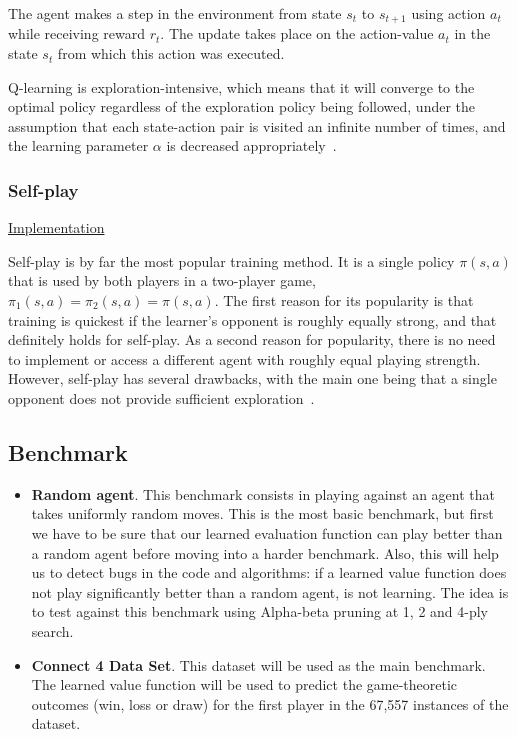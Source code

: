 \documentclass{article}
\newcommand{\GithubURL}[2]{
\noindent
\href{https://github.com/davidrobles/mlnd-capstone-code/blob/master/#1}{#2}
\break
}
\begin{document}
The agent makes a step in the environment from state $s_t$ to $s_{t+1}$ using action $a_t$ while
receiving reward $r_t$. The update takes place on the action-value $a_t$ in the state $s_t$ from
which this action was executed.

Q-learning is exploration-intensive, which means that it will converge to the optimal policy
regardless of the exploration policy being followed, under the assumption that each state-action
pair is visited an infinite number of times, and the learning parameter $\alpha$ is decreased
appropriately~\citep{Watkins1992Q}.

\subsubsection{Self-play}

\GithubURL{capstone/rl/learners/qlearning_selfplay.py}{Implementation}

Self-play is by far the most popular training method. It is a single policy $\pi(s,a)$ that is used
by both players in a two-player game, $\pi_1(s,a) = \pi_2(s,a) = \pi(s,a)$. The first reason for its
popularity is that training is quickest if the learner's opponent is roughly equally strong, and
that definitely holds for self-play. As a second reason for popularity, there is no need to
implement or access a different agent with roughly equal playing strength. However, self-play has
several drawbacks, with the main one being that a single opponent does not provide sufficient
exploration~\citep{Szita2011RLGames}.

\subsection{Benchmark}
\label{sec:benchmark}

\begin{itemize}

    \item \textbf{Random agent}. This benchmark consists in playing against an agent that takes
        uniformly random moves. This is the most basic benchmark, but first we have to be sure that
        our learned evaluation function can play better than a random agent before moving into a
        harder benchmark. Also, this will help us to detect bugs in the code and algorithms: if a
        learned value function does not play significantly better than a random agent, is not
        learning. The idea is to test against this benchmark using Alpha-beta pruning at 1, 2 and
        4-ply search.

    \item \textbf{Connect 4 Data Set}. This dataset will be used as the main benchmark. The learned
        value function will be used to predict the game-theoretic outcomes (win, loss or draw) for
        the first player in the 67,557 instances of the dataset.

\end{itemize}
\end{document}
